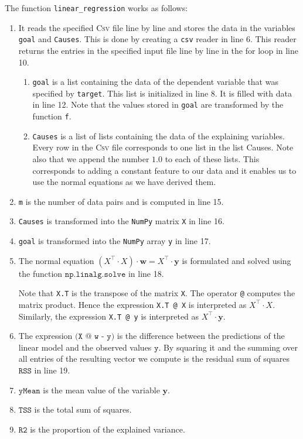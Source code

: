 \noindent
The function \texttt{linear\_regression} works as follows:
\begin{enumerate}
\item It reads the specified \textsc{Csv} file line by line and stores the data in the variables \texttt{goal} and
      \texttt{Causes}.  This is done by creating a \texttt{csv} reader in line 6.  This reader returns the
      entries in the specified input file line by line in the for loop in line 10. 
      \begin{enumerate}
      \item \texttt{goal} is a list containing the data of the dependent variable that was specified by
            \texttt{target}.  This list is initialized in line 8.  It is filled with data in line 12.
            Note that the values stored in \texttt{goal} are transformed by the function \texttt{f}.
      \item \texttt{Causes} is a list of lists containing the data of the explaining variables.
            Every row in the \textsc{Csv} file corresponds to one list in the list Causes.
            Note also that we append the number $1.0$ to each of these lists.  This corresponds to adding a
            constant feature to our data and it enables us to use the normal equations as we have derived them.
      \end{enumerate}
\item \texttt{m} is the number of data pairs and is computed in line 15.
\item \texttt{Causes} is transformed into the \texttt{NumPy} matrix \texttt{X} in line 16. 
\item \texttt{goal} is transformed into the \texttt{NumPy} array \texttt{y} in line 17.
\item The normal equation $(X^\top \cdot X) \cdot \mathbf{w} = X^\top \cdot \mathbf{y}$ is formulated and
      solved using the function $\mathtt{np.linalg.solve}$ in line 18.
     
      Note that \texttt{X.T} is the transpose of the matrix \texttt{X}.  The operator \texttt{@} computes the
      matrix product.  Hence the expression \texttt{X.T @ X} is interpreted as 
      $X^\top \cdot X$.  Similarly, the expression \texttt{X.T @ y} is interpreted as $X^\top \cdot \mathbf{y}$.
\item The expression $\texttt{(X @ w - y)}$ is the difference between the predictions of the linear model and the observed
      values $\mathtt{y}$.  By squaring it and the summing over all entries of the resulting vector we compute
      is the residual sum of squares $\texttt{RSS}$ in line 19.
\item $\mathtt{yMean}$ is the mean value of the variable $\mathbf{y}$.
\item $\mathtt{TSS}$ is the total sum of squares.
\item $\mathtt{R2}$ is the proportion of the explained variance.
\end{enumerate}
